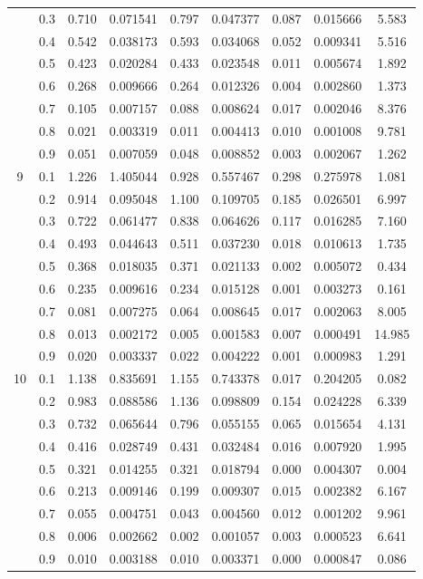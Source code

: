 \begin{longtable}{ | c | c || c | c | c | c | c | c | c | }
 & 0.3 & 0.710 & 0.071541 & 0.797 & 0.047377 & 0.087 & 0.015666 & 5.583 \\
 & 0.4 & 0.542 & 0.038173 & 0.593 & 0.034068 & 0.052 & 0.009341 & 5.516 \\
 & 0.5 & 0.423 & 0.020284 & 0.433 & 0.023548 & 0.011 & 0.005674 & 1.892 \\
 & 0.6 & 0.268 & 0.009666 & 0.264 & 0.012326 & 0.004 & 0.002860 & 1.373 \\
 & 0.7 & 0.105 & 0.007157 & 0.088 & 0.008624 & 0.017 & 0.002046 & 8.376 \\
 & 0.8 & 0.021 & 0.003319 & 0.011 & 0.004413 & 0.010 & 0.001008 & 9.781 \\
 & 0.9 & 0.051 & 0.007059 & 0.048 & 0.008852 & 0.003 & 0.002067 & 1.262 \\
 \hline
\multirow{9}{*}{9} & 0.1 & 1.226 & 1.405044 & 0.928 & 0.557467 & 0.298 & 0.275978 & 1.081 \\
 & 0.2 & 0.914 & 0.095048 & 1.100 & 0.109705 & 0.185 & 0.026501 & 6.997 \\
 & 0.3 & 0.722 & 0.061477 & 0.838 & 0.064626 & 0.117 & 0.016285 & 7.160 \\
 & 0.4 & 0.493 & 0.044643 & 0.511 & 0.037230 & 0.018 & 0.010613 & 1.735 \\
 & 0.5 & 0.368 & 0.018035 & 0.371 & 0.021133 & 0.002 & 0.005072 & 0.434 \\
 & 0.6 & 0.235 & 0.009616 & 0.234 & 0.015128 & 0.001 & 0.003273 & 0.161 \\
 & 0.7 & 0.081 & 0.007275 & 0.064 & 0.008645 & 0.017 & 0.002063 & 8.005 \\
 & 0.8 & 0.013 & 0.002172 & 0.005 & 0.001583 & 0.007 & 0.000491 & 14.985 \\
 & 0.9 & 0.020 & 0.003337 & 0.022 & 0.004222 & 0.001 & 0.000983 & 1.291 \\
 \hline
\multirow{9}{*}{10} & 0.1 & 1.138 & 0.835691 & 1.155 & 0.743378 & 0.017 & 0.204205 & 0.082 \\
 & 0.2 & 0.983 & 0.088586 & 1.136 & 0.098809 & 0.154 & 0.024228 & 6.339 \\
 & 0.3 & 0.732 & 0.065644 & 0.796 & 0.055155 & 0.065 & 0.015654 & 4.131 \\
 & 0.4 & 0.416 & 0.028749 & 0.431 & 0.032484 & 0.016 & 0.007920 & 1.995 \\
 & 0.5 & 0.321 & 0.014255 & 0.321 & 0.018794 & 0.000 & 0.004307 & 0.004 \\
 & 0.6 & 0.213 & 0.009146 & 0.199 & 0.009307 & 0.015 & 0.002382 & 6.167 \\
 & 0.7 & 0.055 & 0.004751 & 0.043 & 0.004560 & 0.012 & 0.001202 & 9.961 \\
 & 0.8 & 0.006 & 0.002662 & 0.002 & 0.001057 & 0.003 & 0.000523 & 6.641 \\
 & 0.9 & 0.010 & 0.003188 & 0.010 & 0.003371 & 0.000 & 0.000847 & 0.086 \\
 \hline
\hline
\end{longtable}
 
